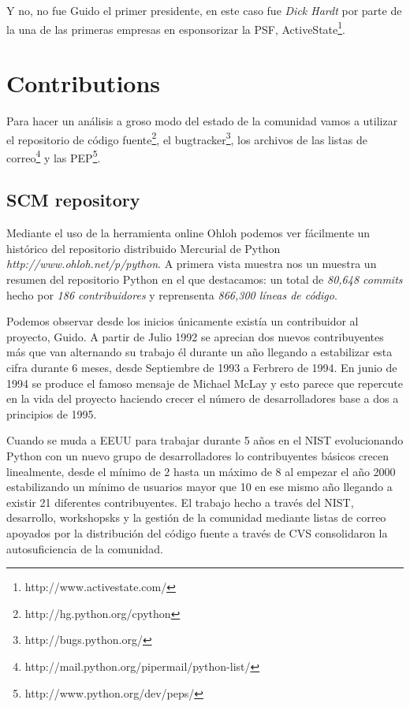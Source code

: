 \documentclass[11pt]{scrartcl}
\begin{document}
Y no, no fue Guido el primer presidente, en este caso fue \emph{Dick Hardt} por parte de la una de las primeras empresas en esponsorizar la PSF, ActiveState\footnote{http://www.activestate.com/}.

\section{Contributions}

Para hacer un análisis a groso modo del estado de la comunidad vamos a utilizar el repositorio de código fuente\footnote{http://hg.python.org/cpython}, el bugtracker\footnote{http://bugs.python.org/}, los archivos de las listas de correo\footnote{http://mail.python.org/pipermail/python-list/} y las PEP\footnote{http://www.python.org/dev/peps/}.

\subsection{SCM repository}

Mediante el uso de la herramienta online Ohloh podemos ver fácilmente un histórico del repositorio distribuido Mercurial de Python \emph{http://www.ohloh.net/p/python}. A primera vista muestra nos un muestra un resumen del repositorio Python en el que destacamos: un total de \emph{80,648 commits} hecho por \emph{186 contribuidores} y reprensenta \emph{866,300 líneas de código}.

Podemos observar desde los inicios únicamente existía un contribuidor al proyecto, Guido. A partir de Julio 1992 se aprecian dos nuevos contribuyentes más que van alternando su trabajo él durante un año llegando a estabilizar esta cifra durante 6 meses, desde Septiembre de 1993 a Ferbrero de 1994. En junio de 1994 se produce el famoso mensaje de Michael McLay y esto parece que repercute en la vida del proyecto haciendo crecer el número de desarrolladores base a dos a principios de 1995. 

Cuando se muda a EEUU para trabajar durante 5 años en el NIST evolucionando Python con un nuevo grupo de desarrolladores lo contribuyentes básicos crecen linealmente, desde el mínimo de 2 hasta un máximo de 8 al empezar el año 2000 estabilizando un mínimo de usuarios mayor que 10 en ese mismo año llegando a existir 21 diferentes contribuyentes. El trabajo hecho a través del NIST, desarrollo, workshopsks y la gestión de la comunidad mediante listas de correo apoyados por la distribución del código fuente a través de CVS consolidaron la autosuficiencia de la comunidad.
\end{document}

